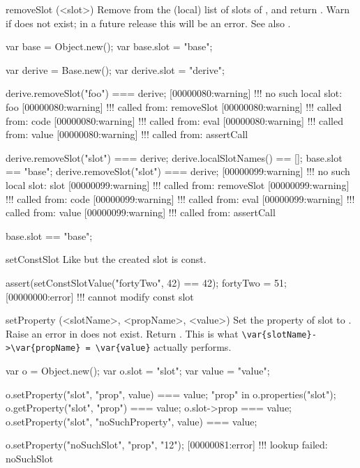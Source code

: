 \begin{urbiscriptapi}
\item[removeSlot](<slot>)%
  Remove  from the (local) list of slots of \this, and return
  \this.  Warn if  does not exist; in a future release this will
  be an error.  See also .
\begin{urbiassert}
var base = Object.new();
var base.slot = "base";

var derive = Base.new();
var derive.slot = "derive";

derive.removeSlot("foo") === derive;
[00000080:warning] !!! no such local slot: foo
[00000080:warning] !!!    called from: removeSlot
[00000080:warning] !!!    called from: code
[00000080:warning] !!!    called from: eval
[00000080:warning] !!!    called from: value
[00000080:warning] !!!    called from: assertCall

derive.removeSlot("slot") === derive;
derive.localSlotNames() == [];
base.slot == "base";
derive.removeSlot("slot") === derive;
[00000099:warning] !!! no such local slot: slot
[00000099:warning] !!!    called from: removeSlot
[00000099:warning] !!!    called from: code
[00000099:warning] !!!    called from: eval
[00000099:warning] !!!    called from: value
[00000099:warning] !!!    called from: assertCall

base.slot == "base";
\end{urbiassert}


\item[setConstSlot]%
  Like  but the created slot is const.
\begin{urbiscript}
assert(setConstSlotValue("fortyTwo", 42) == 42);
fortyTwo = 51;
[00000000:error] !!! cannot modify const slot
\end{urbiscript}


\item[setProperty](<slotName>, <propName>, <value>)%
  Set the property  of slot  to .
  Raise an error in  does not exist.  Return .
  This is what \lstinline|\var{slotName}->\var{propName} = \var{value}|
  actually performs.
\begin{urbiassert}
var o = Object.new();
var o.slot = "slot";
var value = "value";

o.setProperty("slot", "prop", value) === value;
"prop" in o.properties("slot");
o.getProperty("slot", "prop") === value;
o.slot->prop === value;
o.setProperty("slot", "noSuchProperty", value) === value;

o.setProperty("noSuchSlot", "prop", "12");
[00000081:error] !!! lookup failed: noSuchSlot
\end{urbiassert}


\end{urbiscriptapi}
